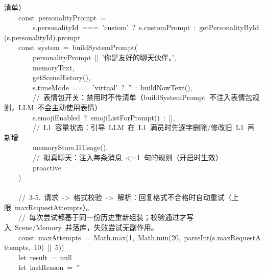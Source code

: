 \documentclass[a4paper,10pt]{article}
\begin{document}
{清单）\\
~~~~const~personalityPrompt~=\\
~~~~~~~~s.personalityId~===~'custom'~?~s.customPrompt~:~getPersonalityById(s.personalityId).prompt\\
~~~~const~system~=~buildSystemPrompt(\\
~~~~~~~~personalityPrompt~||~'你是友好的聊天伙伴。',\\
~~~~~~~~memoryText,\\
~~~~~~~~getSceneHistory(),\\
~~~~~~~~s.timeMode~===~'virtual'~?~''~:~buildNowText(),\\
~~~~~~~~//~表情包开关：禁用时不传清单（buildSystemPrompt~不注入表情包规则，LLM~不会主动使用表情）\\
~~~~~~~~s.emojiEnabled~?~emojiListForPrompt()~:~[],\\
~~~~~~~~//~L1~容量状态：引导~LLM~在~L1~满员时先逐字删除/修改旧~L1~再新增\\
~~~~~~~~memoryStore.l1Usage(),\\
~~~~~~~~//~拟真聊天：注入每条消息~<=1~句的规则（开启时生效）\\
~~~~~~~~proactive\\
~~~~)\\
\mbox{}\\
~~~~//~3-5.~请求~->~格式校验~->~解析：回复格式不合格时自动重试（上限~maxRequestAttempts）。\\
~~~~//~每次尝试都基于同一份历史重新组装；校验通过才写入~Scene/Memory~并落库，失败尝试无副作用。\\
~~~~const~maxAttempts~=~Math.max(1,~Math.min(20,~parseInt(s.maxRequestAttempts,~10)~||~5))\\
~~~~let~result~=~null\\
~~~~let~lastReason~=~''
}

\newpage
\end{document}
